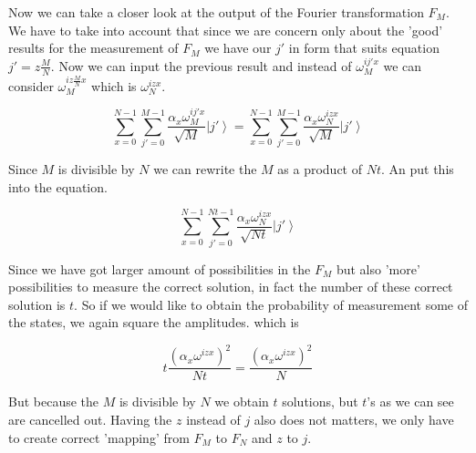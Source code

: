 \documentclass[a4paper,10pt]{article}
\newcommand{\ket}[1]{\ensuremath{\left|#1\right\rangle}} %
\begin{document}
\begin{enumerate}[1]
Now we can take a closer look at the output of the Fourier transformation $F_M$. We have to take into account that since we are concern only about the 'good' results for the measurement of $F_M$ we have our $j'$ in form that suits equation $j'=z\frac{M}{N}$. Now we can input the previous result and instead of
$\omega_M^{ij'x}$ we can consider $\omega_M^{iz\frac{M}{N}x}$ which is $\omega_N^{izx}$.

$$
\sum_{x=0}^{N-1} \sum_{j'=0}^{M-1} \frac{\alpha_x \omega_M^{ij'x}}{\sqrt{M}} \ket{j'} = 
\sum_{x=0}^{N-1} \sum_{j'=0}^{M-1} \frac{\alpha_x \omega_N^{izx}}{\sqrt{M}} \ket{j'}
$$

Since $M$ is divisible by $N$ we can rewrite the $M$ as a product of $Nt$. An put this into the equation.

$$
\sum_{x=0}^{N-1} \sum_{j'=0}^{Nt-1} \frac{\alpha_x \omega_N^{izx}}{\sqrt{Nt}} \ket{j'}
$$

Since we have got larger amount of possibilities in the $F_M$ but also 'more' possibilities to measure the correct solution, in fact the number of these correct solution is $t$. So if we would like to obtain the probability of measurement some of the states, we again square the amplitudes. which is 

$$
t\frac{\left(\alpha_x \omega^{izx}\right)^2}{Nt} =  \frac{\left(\alpha_x \omega^{izx}\right)^2}{N}
$$

But because the $M$ is divisible by $N$ we obtain $t$ solutions, but $t$'s as we can see are cancelled out. Having the $z$ instead of $j$ also does not matters, we only have to create correct 'mapping' from $F_M$ to $F_N$ and $z$ to $j$.
\end{enumerate}
\end{document}
